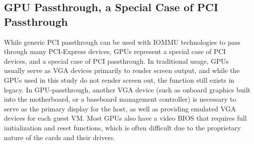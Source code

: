
\subsection{GPU Passthrough, a Special Case of PCI Passthrough}

While generic PCI passthrough can be used with IOMMU technologies to pass
through many PCI-Express devices, GPUs represent a special case of PCI
devices, and a special case of PCI passthrough. In traditional usage, GPUs usually serve as VGA devices primarily to
render screen output, and while the GPUs used in this study do not render screen
out, the function still exists in legacy. In GPU-passthrough, another VGA device
(such as onboard graphics built into the motherboard, or a baseboard management
controller) is necessary to serve as the primary display for the host, as well
as providing emulated VGA devices for each guest VM. Most GPUs also have a video
BIOS that requires full initialization and reset functions, which is often difficult due to the proprietary nature of the cards and their drivers. 



